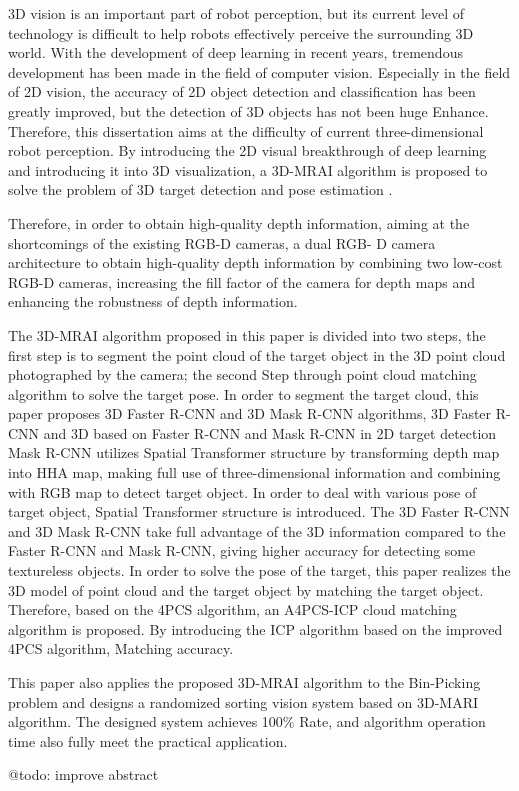 \begin{eabstract}
3D vision is an important part of robot perception, but its current level of technology is difficult to help robots effectively perceive the surrounding 3D world. With the development of deep learning in recent years, tremendous development has been made in the field of computer vision. Especially in the field of 2D vision, the accuracy of 2D object detection and classification has been greatly improved, but the detection of 3D objects has not been huge Enhance. Therefore, this dissertation aims at the difficulty of current three-dimensional robot perception. By introducing the 2D visual breakthrough of deep learning and introducing it into 3D visualization, a 3D-MRAI algorithm is proposed to solve the problem of 3D target detection and pose estimation .

  Therefore, in order to obtain high-quality depth information, aiming at the shortcomings of the existing RGB-D cameras, a dual RGB- D camera architecture to obtain high-quality depth information by combining two low-cost RGB-D cameras, increasing the fill factor of the camera for depth maps and enhancing the robustness of depth information.

  The 3D-MRAI algorithm proposed in this paper is divided into two steps, the first step is to segment the point cloud of the target object in the 3D point cloud photographed by the camera; the second Step through point cloud matching algorithm to solve the target pose. In order to segment the target cloud, this paper proposes 3D Faster R-CNN and 3D Mask R-CNN algorithms, 3D Faster R-CNN and 3D based on Faster R-CNN and Mask R-CNN in 2D target detection Mask R-CNN utilizes Spatial Transformer structure by transforming depth map into HHA map, making full use of three-dimensional information and combining with RGB map to detect target object. In order to deal with various pose of target object, Spatial Transformer structure is introduced. The 3D Faster R-CNN and 3D Mask R-CNN take full advantage of the 3D information compared to the Faster R-CNN and Mask R-CNN, giving higher accuracy for detecting some textureless objects. In order to solve the pose of the target, this paper realizes the 3D model of point cloud and the target object by matching the target object. Therefore, based on the 4PCS algorithm, an A4PCS-ICP cloud matching algorithm is proposed. By introducing the ICP algorithm based on the improved 4PCS algorithm, Matching accuracy.

  This paper also applies the proposed 3D-MRAI algorithm to the Bin-Picking problem and designs a randomized sorting vision system based on 3D-MARI algorithm. The designed system achieves 100\% Rate, and algorithm operation time also fully meet the practical application.

  @todo: improve abstract
\end{eabstract}


